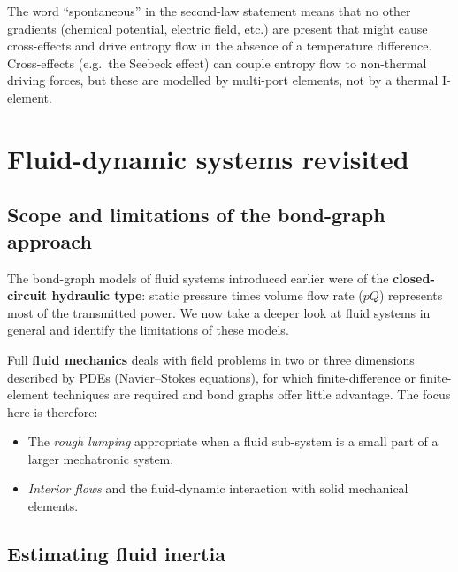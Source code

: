 \begin{insightbox}
  The word ``spontaneous'' in the second-law statement means that no other
  gradients (chemical potential, electric field, etc.) are present that
  might cause cross-effects and drive entropy flow in the absence of a
  temperature difference.  Cross-effects (e.g.\ the Seebeck effect) can
  couple entropy flow to non-thermal driving forces, but these are modelled
  by multi-port elements, not by a thermal I-element.
\end{insightbox}


\section{Fluid-dynamic systems revisited}
\label{sec:fluid_revisited}

\subsection{Scope and limitations of the bond-graph approach}
\label{ssec:fluid_scope}

The bond-graph models of fluid systems introduced earlier were of the
\textbf{closed-circuit hydraulic type}: static pressure times volume flow
rate ($pQ$) represents most of the transmitted power.  We now take a deeper
look at fluid systems in general and identify the limitations of these
models.

Full \textbf{fluid mechanics} deals with field problems in two or three
dimensions described by PDEs (Navier--Stokes equations), for which
finite-difference or finite-element techniques are required and bond graphs
offer little advantage.  The focus here is therefore:
\begin{itemize}[leftmargin=2em,itemsep=2pt]
  \item The \emph{rough lumping} appropriate when a fluid sub-system is a
    small part of a larger mechatronic system.
  \item \emph{Interior flows} and the fluid-dynamic interaction with solid
    mechanical elements.
\end{itemize}


\subsection{Estimating fluid inertia}
\label{ssec:fluid_inertia}


